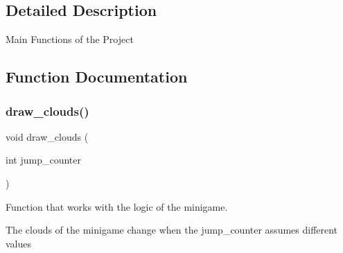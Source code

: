 \subsection{Detailed Description}
Main Functions of the Project 

\subsection{Function Documentation}
\mbox{\label{group__main__functions_ga527ecae69a4a84b54c2c1e0fdfb4b72d}} 
\subsubsection{\texorpdfstring{draw\+\_\+clouds()}{draw\_clouds()}}
{\footnotesize\ttfamily void draw\+\_\+clouds (\begin{DoxyParamCaption}\item[{int}]{jump\+\_\+counter }\end{DoxyParamCaption})}



Function that works with the logic of the minigame. 

The clouds of the minigame change when the jump\+\_\+counter assumes different values



